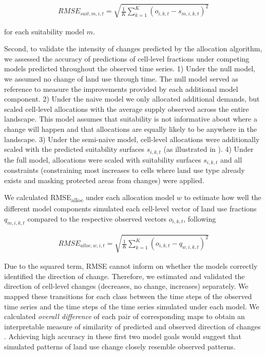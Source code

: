 \documentclass[titlesmallcaps,copyrightpage]{uomthesis}\usepackage[]{graphicx}\usepackage[]{color}
\begin{document}
\begin{equation}
\begin{aligned}
RMSE_{suit,m,i,t} = \sqrt{\frac{1}{K} \sum_{k=1}^K(o_{i,k,t}-s_{m,i,k,t})^2}
\end{aligned}
\end{equation}


for each suitability model \(m\).

Second, to validate the intensity of changes predicted by the allocation
algorithm, we assessed the accuracy of predictions of cell-level
fractions under competing models predicted throughout the observed time
series. 1) Under the null model, we assumed no change of land use
through time. The null model served as reference to measure the
improvements provided by each additional model component. 2) Under the
naive model we only allocated additional demands, but scaled cell-level
allocations with the average supply observed across the entire
landscape. This model assumes that suitability is not informative about
where a change will happen and that allocations are equally likely to be
anywhere in the landscape. 3) Under the semi-naive model, cell-level
allocations were additionally scaled with the predicted suitability
surfaces \(s_{i,k,t}\) (as illustrated in ). 4)
Under the full model, allocations were scaled with suitability surfaces
\(s_{i,k,t}\) and all constraints (constraining most increases to cells
where land use type already exists and masking protected areas from
changes) were applied.

We calculated RMSE\textsubscript{alloc} under each allocation model
\(w\) to estimate how well the different model components simulated each
cell-level vector of land use fractions \(q_{m,i,k,t}\) compared to the
respective observed vectors \(o_{i,k,t}\), following

\begin{equation}
\begin{aligned}
RMSE_{alloc, w,i,t} = \sqrt{\frac{1}{K} \sum_{k=1}^K(o_{i,k,t}-q_{w,i,k,t})^2}
\end{aligned}
\end{equation}

Due to the squared term, RMSE cannot inform on whether the models
correctly identified the direction of change. Therefore, we estimated
and validated the direction of cell-level changes (decreases, no change,
increases) separately. We mapped these transitions for each class
between the time steps of the observed time series and the time steps of
the time series simulated under each model. We calculated \emph{overall
difference} of each pair of corresponding maps to obtain an
interpretable measure of similarity of predicted and observed direction
of changes \citep{pontius_death_2011, pontius_quantity_2014}. Achieving
high accuracy in these first two model goals would suggest that
simulated patterns of land use change closely resemble observed
patterns.
\end{document}
